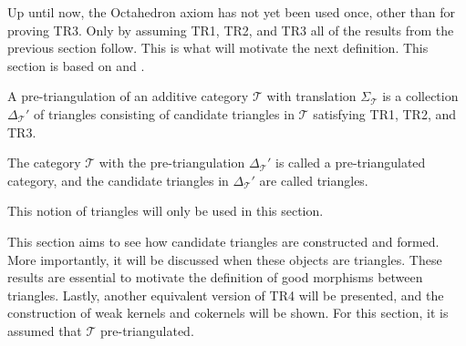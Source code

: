     Up until now, the Octahedron axiom has not yet been used once, other than for proving TR3. Only by assuming TR1, TR2, and TR3 all of the results from the previous section follow. This is what will motivate the next definition. This section is based on \cite{neeman} and \cite{May01}.

    \begin{definition}
        A pre-triangulation of an additive category $\mathcal{T}$ with translation $\Sigma_{\mathcal{T}}$ is a collection $\Delta_{\mathcal{T}}'$ of triangles consisting of candidate triangles in $\mathcal{T}$ satisfying TR1, TR2, and TR3.

        The category $\mathcal{T}$ with the pre-triangulation $\Delta_{\mathcal{T}}'$ is called a pre-triangulated category, and the candidate triangles in $\Delta_{\mathcal{T}}'$ are called  triangles.
    \end{definition}

    \begin{remark}
        This notion of triangles will only be used in this section.
    \end{remark}

    This section aims to see how candidate triangles are constructed and formed. More importantly, it will be discussed when these objects are triangles. These results are essential to motivate the definition of good morphisms between triangles. Lastly, another equivalent version of TR4 will be presented, and the construction of weak kernels and cokernels will be shown. For this section, it is assumed that $\mathcal{T}$ pre-triangulated.


